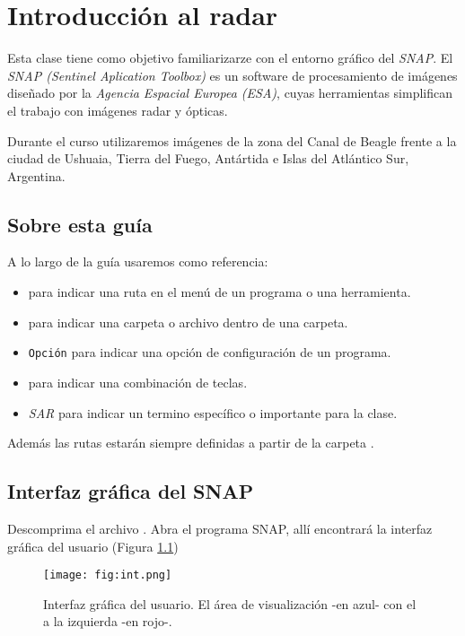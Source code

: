 \chapter{Introducción al radar}

Esta clase tiene como objetivo familiarizarze con el entorno gráfico del \emph{SNAP}. El \emph{SNAP (Sentinel Aplication Toolbox)} es un  software de procesamiento de imágenes diseñado por la \emph{Agencia Espacial Europea (ESA)}, cuyas herramientas simplifican el trabajo con imágenes radar y ópticas.

Durante el curso utilizaremos imágenes de la zona del Canal de Beagle frente a la ciudad de Ushuaia, Tierra del Fuego, Antártida e Islas del Atlántico Sur, Argentina.

\section{Sobre esta guía}

A lo largo de la guía usaremos como referencia:

\begin{itemize}
  \item {} para indicar una ruta en el menú de un programa o una herramienta.
  \item {} para indicar una carpeta o archivo dentro de una carpeta.
  \item \texttt{Opción} para indicar una opción de configuración de un programa.
  \item {} para indicar una combinación de teclas.
  \item \emph{SAR} para indicar un termino específico o importante para la clase.
\end{itemize}

Además las rutas estarán siempre definidas a partir de la carpeta .

\section{Interfaz gráfica del SNAP}

Descomprima el archivo . Abra el programa SNAP, allí encontrará la interfaz gráfica del usuario (Figura \ref{fig:int})

\begin{figure}[h!]
    \centering
    \texttt{[image: fig:int.png]}
    \caption{Interfaz gráfica del usuario. El área de visualización -en azul- con el  a la izquierda -en rojo-.}
    \label{fig:int}
\end{figure}


